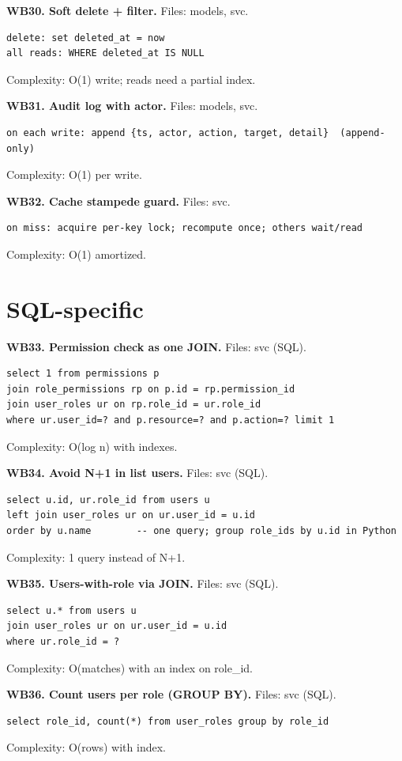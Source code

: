 \documentclass[11pt,a4paper]{report}
\begin{document}
\textbf{WB30. Soft delete + filter.} Files: models, svc.
\begin{lstlisting}
delete: set deleted_at = now
all reads: WHERE deleted_at IS NULL
\end{lstlisting}
Complexity: O(1) write; reads need a partial index.

\textbf{WB31. Audit log with actor.} Files: models, svc.
\begin{lstlisting}
on each write: append {ts, actor, action, target, detail}  (append-only)
\end{lstlisting}
Complexity: O(1) per write.

\textbf{WB32. Cache stampede guard.} Files: svc.
\begin{lstlisting}
on miss: acquire per-key lock; recompute once; others wait/read
\end{lstlisting}
Complexity: O(1) amortized.

\section{SQL-specific}

\textbf{WB33. Permission check as one JOIN.} Files: svc (SQL).
\begin{lstlisting}
select 1 from permissions p
join role_permissions rp on p.id = rp.permission_id
join user_roles ur on rp.role_id = ur.role_id
where ur.user_id=? and p.resource=? and p.action=? limit 1
\end{lstlisting}
Complexity: O(log n) with indexes.

\textbf{WB34. Avoid N+1 in list users.} Files: svc (SQL).
\begin{lstlisting}
select u.id, ur.role_id from users u
left join user_roles ur on ur.user_id = u.id
order by u.name        -- one query; group role_ids by u.id in Python
\end{lstlisting}
Complexity: 1 query instead of N+1.

\textbf{WB35. Users-with-role via JOIN.} Files: svc (SQL).
\begin{lstlisting}
select u.* from users u
join user_roles ur on ur.user_id = u.id
where ur.role_id = ?
\end{lstlisting}
Complexity: O(matches) with an index on role\_id.

\textbf{WB36. Count users per role (GROUP BY).} Files: svc (SQL).
\begin{lstlisting}
select role_id, count(*) from user_roles group by role_id
\end{lstlisting}
Complexity: O(rows) with index.
\end{document}

